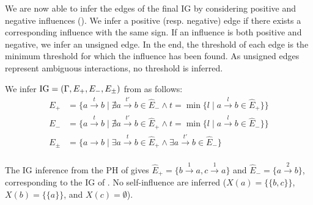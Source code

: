 We are now able to infer the edges of the final IG by considering positive and negative influences
().
We infer a positive (resp. negative) edge if there exists a corresponding influence with the same
sign. If an influence is both positive and negative, we infer an unsigned edge. In the end, the
threshold of each edge is the minimum threshold for which the influence has been found. As unsigned
edges represent ambiguous interactions, no threshold is inferred.
\begin{proposition}\label{pps:inference-IG}
We infer $\mathrm{IG} = (\Gamma,E_+,E_-,E_\pm)$ from  as follows:
\begin{align*}
E_+ &= \{a \xrightarrow{t} b \mid \nexists a \xrightarrow{t'} b \in \hat{E}_-
  \wedge t = \min \{ l \mid a \xrightarrow{l} b \in \hat{E}_+\}\} \\
E_- &= \{a \xrightarrow{t} b \mid \nexists a \xrightarrow{t'} b \in \hat{E}_+
  \wedge t = \min \{l \mid a \xrightarrow{l} b \in \hat{E}_-\}\} \\
E_\pm &= \{a \rightarrow b \mid \exists a \xrightarrow{t} b \in \hat{E}_+ \wedge \exists a \xrightarrow{t'} b \in \hat{E}_-\} \\
\end{align*}
\end{proposition}


\begin{example*}
The IG inference from the PH of  gives
$\hat{E}_+ = \{b \xrightarrow{1} a, c \xrightarrow{1} a\}$ and 
$\hat{E}_- = \{a \xrightarrow{2} b\}$, corresponding to the IG of .
No self-influence are inferred ($X(a) = \{ \{b,c\} \}$, $X(b)=\{ \{a\}\}$, and $X(c)=\emptyset$).
\end{example*}
